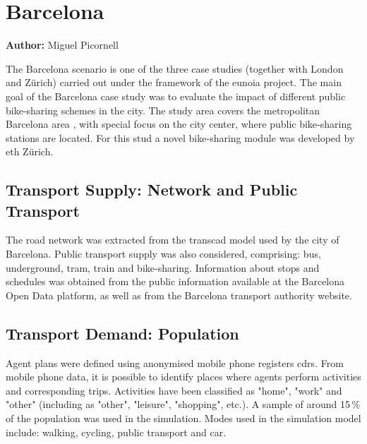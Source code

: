 \section{Barcelona}
\label{sec:barcelona}
\hfill \textbf{Author:} Miguel Picornell


The Barcelona scenario is one of the three case studies (together with London and Zürich) carried out under the framework of the \gls{eunoia} project. The main goal of the Barcelona case study was to evaluate the impact of different public bike-sharing schemes in the city. The study area covers the metropolitan Barcelona area , with special focus on the city center, where public bike-sharing stations are located. For this stud a novel bike-sharing module was developed by \gls{eth} Zürich.

\subsection{Transport Supply: Network and Public Transport}
The road network was extracted from the \gls{transcad} model used by the city of Barcelona. Public transport supply was also considered, comprising: bus, underground, tram, train and bike-sharing. Information about stops and schedules was obtained from the public information available at the Barcelona Open Data platform, as well as from the Barcelona transport authority website. 

\subsection{Transport Demand: Population} 
Agent plans were defined using anonymised mobile phone registers \glspl{cdr}. From mobile phone data, it is possible to identify places where agents perform activities and corresponding trips. Activities have been classified as "home", "work" and "other" (including as "other", "leisure", "shopping", etc.). A sample of around 15\,\% of the population was used in the simulation. Modes used  in the simulation model include: walking, cycling, public transport and car.


